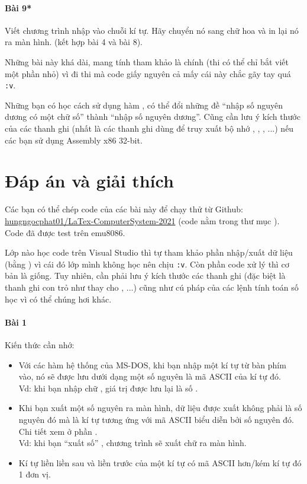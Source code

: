 \documentclass[main.tex]{subfiles}
\begin{document}
\paragraph{Bài 9*} Viết chương trình nhập vào chuỗi kí tự. Hãy chuyển nó sang chữ hoa và in lại nó ra màn hình. (kết hợp bài 4 và bài 8).\bigskip

Những bài này khá dài, mang tính tham khảo là chính (thi có thể chỉ bắt viết một phần nhỏ) vì đi thi mà code giấy nguyên cả mấy cái này chắc gãy tay quá \verb#:v#.\bigskip

Những bạn có học cách sử dụng hàm ,  có thể đổi những đề ``nhập số nguyên dương có một chữ số'' thành ``nhập số nguyên dương''. Cũng cần lưu ý kích thước của các thanh ghi (nhất là các thanh ghi dùng để truy xuất bộ nhớ , , , ...) nếu các bạn sử dụng Assembly x86 32-bit. 
\pagebreak

\section{Đáp án và giải thích}
Các bạn có thể chép code của các bài này để chạy thử từ Github: \href{https://github.com/hungngocphat01/LaTex-ComputerSystem-2021}{hungngocphat01/LaTex-ComputerSystem-2021} (code nằm trong thư mục ).\\
Code đã được test trên emu8086.\bigskip

Lớp nào học code trên Visual Studio thì tự tham khảo phần nhập/xuất dữ liệu (bằng ) vì cái đó lớp mình không học nên chịu \verb#:v#. Còn phần code xử lý thì cơ bản là giống. Tuy nhiên, cần phải lưu ý kích thước các thanh ghi (đặc biệt là thanh ghi con trỏ như  thay cho , ...) cũng như cú pháp của các lệnh tính toán số học vì có thể chúng hơi khác.
\renewcommand{\fcolorbox}[4][]{#4}
\paragraph*{Bài 1}
Kiến thức cần nhớ:
\begin{itemize}
    \item Với các hàm hệ thống của MS-DOS, khi bạn nhập một kí tự từ bàn phím vào, nó sẽ được lưu dưới dạng một số nguyên là mã ASCII của kí tự đó.\\
        Vd: khi bạn nhập chữ , giá trị được lưu lại là số .
    \item Khi bạn xuất một số nguyên ra màn hình, dữ liệu được xuất không phải là số nguyên đó mà là kí tự tương ứng với mã ASCII biểu diễn bởi số nguyên đó. Chi tiết xem ở phần .\\
        Vd: khi bạn ``xuất số'' , chương trình sẽ xuất chữ  ra màn hình.
    \item Kí tự liền liền sau và liền trước của một kí tự có mã ASCII hơn/kém kí tự đó 1 đơn vị.
\end{itemize}
\end{document}

